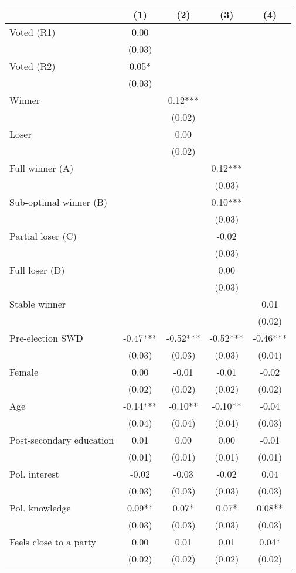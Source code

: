 \begin{tabular}[t]{lcccc}
\toprule
  & (1) & (2) & (3) & (4)\\
\midrule
Voted (R1) & 0.00 &  &  & \\
 & (0.03) &  &  \vphantom{1} & \\
Voted (R2) & 0.05* &  &  & \\
 & (0.03) &  &  & \\
Winner &  & 0.12*** &  & \\
 &  & (0.02) &  \vphantom{1} & \\
Loser &  & 0.00 &  & \\
 &  & (0.02) &  & \\
Full winner (A) &  &  & 0.12*** & \\
 &  &  & (0.03) \vphantom{3} & \\
Sub-optimal winner (B) &  &  & 0.10*** & \\
 &  &  & (0.03) \vphantom{2} & \\
Partial loser (C) &  &  & -0.02 & \\
 &  &  & (0.03) \vphantom{1} & \\
Full loser (D) &  &  & 0.00 & \\
 &  &  & (0.03) & \\
Stable winner &  &  &  & 0.01\\
 &  &  &  & (0.02)\\
Pre-election SWD & -0.47*** & -0.52*** & -0.52*** & -0.46***\\
 & (0.03) & (0.03) & (0.03) & (0.04)\\
Female & 0.00 & -0.01 & -0.01 & -0.02\\
 & (0.02) & (0.02) & (0.02) & \vphantom{4} (0.02)\\
Age & -0.14*** & -0.10** & -0.10** & -0.04\\
 & (0.04) & (0.04) & (0.04) & (0.03)\\
Post-secondary education & 0.01 & 0.00 & 0.00 & -0.01\\
 & (0.01) & (0.01) & (0.01) & (0.01)\\
Pol. interest & -0.02 & -0.03 & -0.02 & 0.04\\
 & (0.03) & (0.03) & (0.03) & \vphantom{1} (0.03)\\
Pol. knowledge & 0.09** & 0.07* & 0.07* & 0.08**\\
 & (0.03) & (0.03) & (0.03) & (0.03)\\
Feels close to a party & 0.00 & 0.01 & 0.01 & 0.04*\\
 & (0.02) & (0.02) & (0.02) & \vphantom{3} (0.02)\\

\end{tabular}
